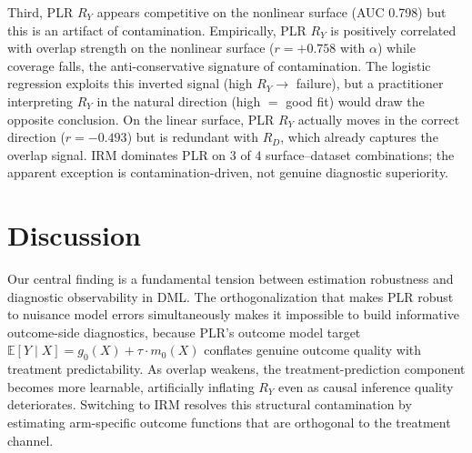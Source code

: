 \documentclass[12pt]{article}
\begin{document}
Third, PLR $R_Y$ appears competitive on the nonlinear surface (AUC 0.798) but this is an artifact of contamination. Empirically, PLR $R_Y$ is positively correlated with overlap strength on the nonlinear surface ($r = +0.758$ with $\alpha$) while coverage falls, the anti-conservative signature of contamination. The logistic regression exploits this inverted signal (high $R_Y \to$ failure), but a practitioner interpreting $R_Y$ in the natural direction (high $= $ good fit) would draw the opposite conclusion. On the linear surface, PLR $R_Y$ actually moves in the correct direction ($r = -0.493$) but is redundant with $R_D$, which already captures the overlap signal. IRM dominates PLR on 3 of 4 surface--dataset combinations; the apparent exception is contamination-driven, not genuine diagnostic superiority.

\section{Discussion}

Our central finding is a fundamental tension between estimation robustness and diagnostic observability in DML. The orthogonalization that makes PLR robust to nuisance model errors simultaneously makes it impossible to build informative outcome-side diagnostics, because PLR's outcome model target $\mathbb{E}[Y \mid X] = g_0(X) + \tau \cdot m_0(X)$ conflates genuine outcome quality with treatment predictability. As overlap weakens, the treatment-prediction component becomes more learnable, artificially inflating $R_Y$ even as causal inference quality deteriorates. Switching to IRM resolves this structural contamination by estimating arm-specific outcome functions that are orthogonal to the treatment channel.
\end{document}
